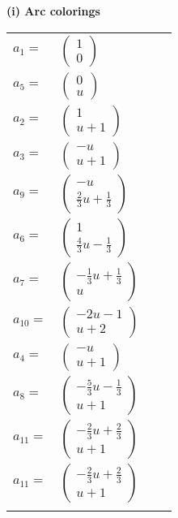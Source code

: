 \documentclass[1p]{elsarticle_modified}
\theoremstyle{definition}
\begin{document}
\flushleft \textbf{(i) Arc colorings}\\
\begin{tabular}{m{7pt} m{180pt} m{7pt} m{180pt} }
\flushright $a_{1}=$&$\begin{pmatrix}1\\0\end{pmatrix}$ \\
\flushright $a_{5}=$&$\begin{pmatrix}0\\u\end{pmatrix}$ \\
\flushright $a_{2}=$&$\begin{pmatrix}1\\u+1\end{pmatrix}$ \\
\flushright $a_{3}=$&$\begin{pmatrix}- u\\u+1\end{pmatrix}$ \\
\flushright $a_{9}=$&$\begin{pmatrix}- u\\\frac{2}{3} u+\frac{1}{3}\end{pmatrix}$ \\
\flushright $a_{6}=$&$\begin{pmatrix}1\\\frac{4}{3} u-\frac{1}{3}\end{pmatrix}$ \\
\flushright $a_{7}=$&$\begin{pmatrix}-\frac{1}{3} u+\frac{1}{3}\\u\end{pmatrix}$ \\
\flushright $a_{10}=$&$\begin{pmatrix}-2 u-1\\u+2\end{pmatrix}$ \\
\flushright $a_{4}=$&$\begin{pmatrix}- u\\u+1\end{pmatrix}$ \\
\flushright $a_{8}=$&$\begin{pmatrix}-\frac{5}{3} u-\frac{1}{3}\\u+1\end{pmatrix}$ \\
\flushright $a_{11}=$&$\begin{pmatrix}-\frac{2}{3} u+\frac{2}{3}\\u+1\end{pmatrix}$\\ \flushright $a_{11}=$&$\begin{pmatrix}-\frac{2}{3} u+\frac{2}{3}\\u+1\end{pmatrix}$\\&\end{tabular}
\end{document}

